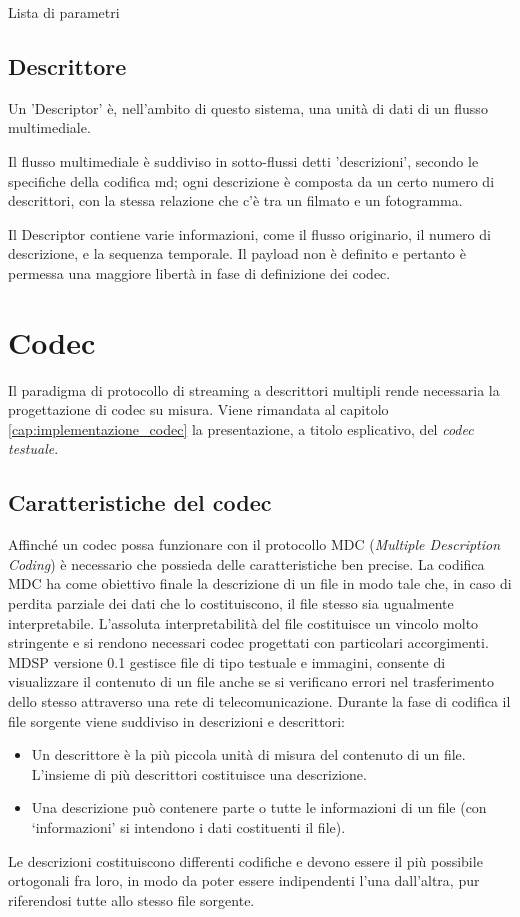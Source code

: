 Lista di parametri

\subsection{Descrittore}


Un 'Descriptor' è, nell'ambito di questo sistema, una unità di dati di un flusso multimediale.

Il flusso multimediale è suddiviso in sotto-flussi detti 'descrizioni', secondo le specifiche della codifica md; ogni descrizione è composta da un certo numero di descrittori, con la stessa relazione che c'è tra un filmato e un fotogramma.

Il Descriptor contiene varie informazioni, come il flusso originario, il numero di descrizione, e la sequenza temporale. Il payload non è definito e pertanto è permessa una maggiore libertà in fase di definizione dei codec.







\section{Codec}
\label{cap:descrizione_codec}
Il paradigma di protocollo di streaming a descrittori multipli rende
necessaria la progettazione di codec su misura. Viene rimandata al capitolo
\ref{cap:implementazione_codec} la presentazione, a titolo esplicativo, del
\emph{codec testuale}.

\subsection{Caratteristiche del codec}
Affinché un codec possa funzionare con il protocollo MDC (\emph{Multiple
Description Coding}) è necessario che possieda delle caratteristiche ben
precise. La codifica MDC ha come obiettivo finale la descrizione di un file in
modo tale che, in caso di perdita parziale dei dati che lo costituiscono, il
file stesso sia ugualmente interpretabile. L'assoluta interpretabilità del
file costituisce un vincolo molto stringente e si rendono necessari codec
progettati con particolari accorgimenti. MDSP versione 0.1 gestisce file di
tipo testuale e immagini, consente di visualizzare il contenuto di un file anche
se si verificano errori nel trasferimento dello stesso attraverso una rete di telecomunicazione. Durante la fase di codifica il file sorgente viene suddiviso in descrizioni e descrittori:
\begin{itemize}
 \item Un descrittore è la più piccola unità di misura del contenuto di un
 file. L'insieme di più descrittori costituisce una descrizione.
 \item Una descrizione può contenere parte o tutte le informazioni di un file
 (con `informazioni' si intendono i dati costituenti il file).
\end{itemize}
Le descrizioni costituiscono differenti codifiche e devono essere il più possibile ortogonali fra loro, in modo da poter essere indipendenti l'una dall'altra, pur riferendosi tutte allo stesso file sorgente.

